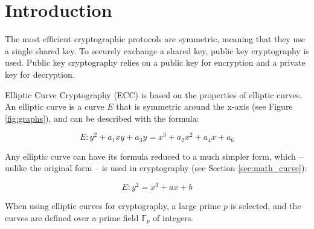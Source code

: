 \section{Introduction}

The most efficient cryptographic protocols are symmetric, meaning that they use a single shared key.
To securely exchange a shared key, public key cryptography is used. Public key cryptography
relies on a public key for encryption and a private key for decryption.

Elliptic Curve Cryptography (ECC) is based on the properties of elliptic curves.
An elliptic curve is a curve \(E\) that is symmetric around the x-axis (see Figure \ref{fig:graphs}),
and can be described with the formula:

\begin{equation} \label{eq:elliptic-curve-formula-full}
	E: y^2 + a_1xy + a_3y = x^3 + a_2x^2 + a_4x + a_6
\end{equation}

Any elliptic curve can have its formula reduced to a much simpler form, which -- unlike the original
form -- is used in cryptography (see Section \ref{sec:math_curve}):

\begin{equation}
	E: y^2 = x^3 + ax + b
\end{equation}

When using elliptic curves for cryptography, a large prime \(p\) is selected, and the curves are defined
over a prime field \(\mathbb{F}_p\) of integers.

